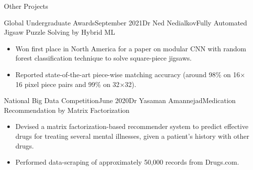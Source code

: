 \begin{rSection}{Other Projects}

\begin{rSubsection}{Global Undergraduate Awards}{September 2021}{Dr Ned Nedialkov}{Fully Automated Jigsaw Puzzle Solving by Hybrid ML}
	\begin{itemize}
      \addtolength\itemsep{-0.5em}
      \item Won first place in North America for a paper on modular CNN with random forest classification technique to solve square-piece jigsaws.
      \item Reported state-of-the-art piece-wise matching accuracy (around 98\% on 16$\times$16 pixel piece pairs and 99\% on 32$\times$32).
    \end{itemize}
\end{rSubsection}

\begin{rSubsection}{National Big Data Competition}{June 2020}{Dr Yasaman Amannejad}{Medication Recommendation by Matrix Factorization}
	\begin{itemize}
      \addtolength\itemsep{-0.5em}
      \item Devised a matrix factorization-based recommender system to predict effective drugs for treating several mental illnesses, given a patient's history with other drugs.
      \item Performed data-scraping of approximately 50,000 records from Drugs.com.
    \end{itemize}
\end{rSubsection}





\end{rSection}
